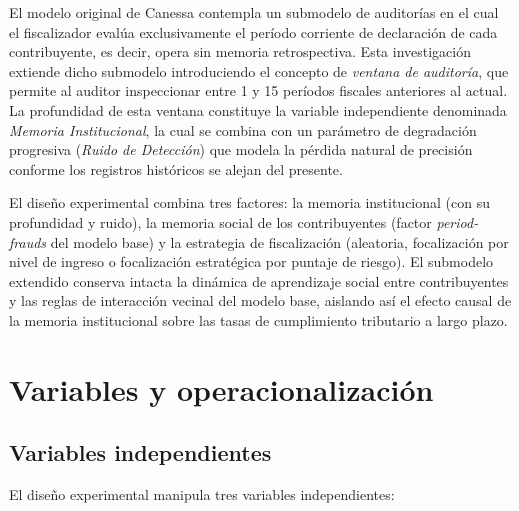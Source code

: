 El modelo original de Canessa contempla un submodelo de auditorías en el cual el fiscalizador evalúa exclusivamente el período corriente de declaración de cada contribuyente, es decir, opera sin memoria retrospectiva. Esta investigación extiende dicho submodelo introduciendo el concepto de \textit{ventana de auditoría}, que permite al auditor inspeccionar entre 1 y 15 períodos fiscales anteriores al actual. La profundidad de esta ventana constituye la variable independiente denominada \textit{Memoria Institucional}, la cual se combina con un parámetro de degradación progresiva (\textit{Ruido de Detección}) que modela la pérdida natural de precisión conforme los registros históricos se alejan del presente.

El diseño experimental combina tres factores: la memoria institucional (con su profundidad y ruido), la memoria social de los contribuyentes (factor \textit{period-frauds} del modelo base) y la estrategia de fiscalización (aleatoria, focalización por nivel de ingreso o focalización estratégica por puntaje de riesgo). El submodelo extendido conserva intacta la dinámica de aprendizaje social entre contribuyentes y las reglas de interacción vecinal del modelo base, aislando así el efecto causal de la memoria institucional sobre las tasas de cumplimiento tributario a largo plazo.

\section{Variables y operacionalización}
\label{sec:variables}

\subsection{Variables independientes}
\label{sec:vi}

El diseño experimental manipula tres variables independientes:

